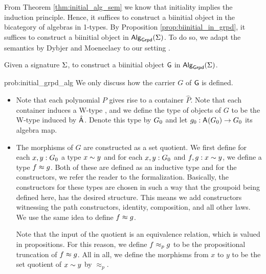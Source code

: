 From Theorem \ref{thm:initial_alg_sem} we know that initiality implies the induction principle.
Hence, it suffices to construct a biinitial object in the bicategory of algebras in 1-types.
By Proposition \ref{prop:biinitial_in_grpd}, it suffices to construct a biinitial object in $\mathsf{Alg}_{\mathsf{Grpd}}(\Sigma)$.
To do so, we adapt the semantics by Dybjer and Moeneclaey to our setting \cite{DBLP:journals/entcs/DybjerM18}.

\begin{problem}
\label{prob:initial_grpd_alg}
Given a signature $\Sigma$, to construct a biinitial object  $\mathsf{G}$ in $\mathsf{Alg}_{\mathsf{Grpd}}(\Sigma)$.
\end{problem}

\begin{construction}{prob:initial_grpd_alg}
\label{constr:initial_grpd_alg}
We only discuss how the carrier $G$ of $\mathsf{G}$ is defined.
\begin{itemize}
	\item Note  that each polynomial $P$ gives rise to a container $\hat{P}$.
	Note that each container induces a W-type \cite{abbott2003categories},
	and we define the type of objects of $G$ to be the W-type induced by $\hat{\mathsf{A}^{}}$.
	Denote this type by $G_0$ and let $g_0 : \mathsf{A}^{}(G_0) \to G_0$ its algebra map.
	\item The morphisms of $G$ are constructed as a set quotient.
	We first define for each $x, y : G_0$ a type ${x \sim y}$
	and for each $x, y : G_0$ and $f, g : {x \sim y}$, we define a type ${f \approx g}$.
	Both of these are defined as an inductive type and for the constructors, we refer the reader to the formalization.
	Basically, the constructors for these types are chosen in such a way that the groupoid being defined here, has the desired structure.
	This means we add constructors witnessing the path constructors, identity, composition, and all other laws.
	We use the same idea to define ${f \approx g}$.
	
	Note that the input of the quotient is an equivalence relation, which is valued in propositions.
	For this reason, we define ${f \approx_p g}$ to be the propositional truncation of ${f \approx g}$.
	All in all, we define the morphisms from $x$ to $y$ to be the set quotient of ${x \sim y}$ by $\approx_p$.
	\qedhere	
\end{itemize}
\end{construction}

